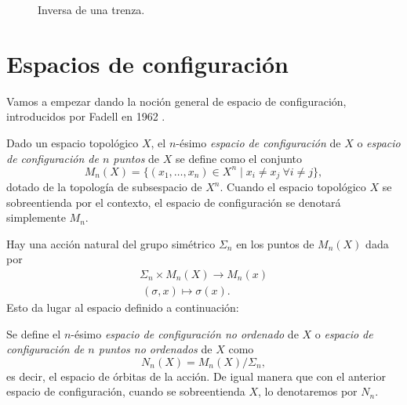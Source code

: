 \documentclass[TFG.tex]{subfiles}
\begin{document}

\begin{figure}[h!]
\caption{Inversa de una trenza.}\label{especular}
\end{figure}


\section{Espacios de configuración}
Vamos a empezar dando la noción general de espacio de configuración, introducidos por Fadell en 1962 \cite{Fadell}.
\begin{defi}
Dado un espacio topológico $X$, el $n$-ésimo \emph{espacio de configuración} de $X$ o \emph{espacio de configuración de $n$ puntos} de $X$ se define como el conjunto
$$M_n(X)=\{(x_1,\dots,x_n)\in X^n\mid x_i\neq x_j\ \forall i\neq j\},$$
dotado de la topología de subsespacio de $X^n$. Cuando el espacio topológico $X$ se sobreentienda por el contexto, el espacio de configuración se denotará simplemente $M_n$. 
\end{defi}

Hay una acción natural del grupo simétrico $\Sigma_n$ en los puntos de $M_n(X)$ dada por 
\begin{gather*}
\Sigma_n\times M_n(X)\to M_n(x)\\
\ (\sigma,x)\mapsto \sigma(x).
\end{gather*}
Esto da lugar al espacio definido a continuación:
\begin{defi}
Se define el $n$-ésimo \emph{espacio de configuración no ordenado} de $X$ o \emph{espacio de configuración de $n$ puntos no ordenados} de $X$ como 
$$N_n(X)=M_n(X)/\Sigma_n,$$
es decir, el espacio de órbitas de la acción. De igual manera que con el anterior espacio de configuración, cuando se sobreentienda $X$, lo denotaremos por $N_n$. 
\end{defi}
\end{document}
